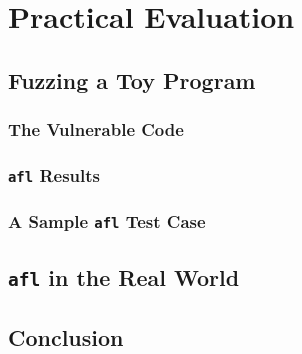 \chapter{Practical Evaluation}


\section{Fuzzing a Toy Program}


\subsection{The Vulnerable Code}


\subsection{\texttt{afl} Results}


\subsection{A Sample \texttt{afl} Test Case}


\section{\texttt{afl} in the Real World}



\section{Conclusion}

